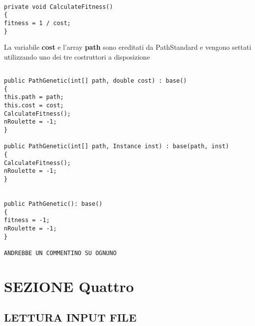 \documentclass[11pt]{article}
\begin{document}
\begin{lstlisting}

private void CalculateFitness()
{
fitness = 1 / cost;
}

\end{lstlisting}

La variabile \textbf{cost} e l’array \textbf{path} sono ereditati da PathStandard e vengono settati utilizzando uno dei tre costruttori a disposizione

\begin{lstlisting}

public PathGenetic(int[] path, double cost) : base()
{
this.path = path;
this.cost = cost;
CalculateFitness();
nRoulette = -1;
}

public PathGenetic(int[] path, Instance inst) : base(path, inst)
{
CalculateFitness();
nRoulette = -1;
}


public PathGenetic(): base()
{
fitness = -1;
nRoulette = -1;
}

ANDREBBE UN COMMENTINO SU OGNUNO

\end{lstlisting}

\section*{SEZIONE Quattro}
\label{sec:SezioneQuattroS}

\subsection*{LETTURA INPUT FILE}
\label{sec:LetturaInputS}
\end{document}
